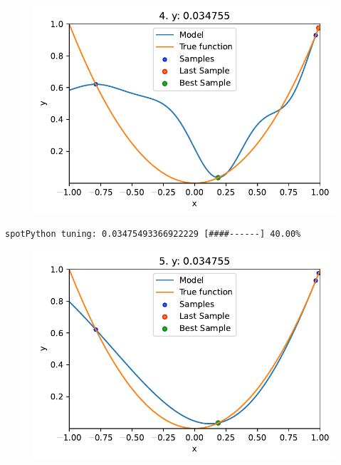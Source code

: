 \documentclass[
  letterpaper,
  DIV=11,
  numbers=noendperiod]{scrreprt}
\begin{document}
\begin{figure}[H]

{\centering \includegraphics{04_spot_sklearn_surrogate_files/figure-pdf/cell-21-output-2.pdf}

}

\end{figure}

\begin{verbatim}
spotPython tuning: 0.03475493366922229 [####------] 40.00% 
\end{verbatim}

\begin{figure}[H]

{\centering \includegraphics{04_spot_sklearn_surrogate_files/figure-pdf/cell-21-output-4.pdf}

}

\end{figure}
\end{document}
